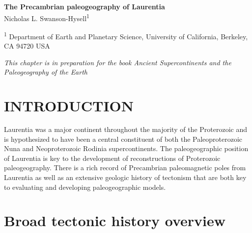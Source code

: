 \documentclass[11pt,letterpaper]{article}
\begin{document}
\begin{flushleft}
{\Large \textbf{The Precambrian paleogeography of Laurentia}}
\\

Nicholas L. Swanson-Hysell\textsuperscript{1}

\bigskip

\textsuperscript{1} Department of Earth and Planetary Science, University of California, Berkeley, CA 94720 USA

\end{flushleft}

\noindent\textit{This chapter is in preparation for the book Ancient Supercontinents and the Paleogeography of the Earth}


\section*{INTRODUCTION}

Laurentia was a major continent throughout the majority of the Proterozoic and is hypothesized to have been a central constituent of both the Paleoproterozoic Nuna and Neoproterozoic Rodinia supercontinents. The paleogeographic position of Laurentia is key to the development of reconstructions of Proterozoic paleogeography. There is a rich record of Precambrian paleomagnetic poles from Laurentia as well as an extensive geologic history of tectonism that are both key to evaluating and developing paleogeographic models.

\section*{Broad tectonic history overview}
\end{document}
